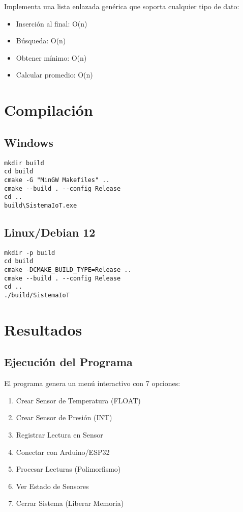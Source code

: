 \documentclass[12pt, spanish]{article}
\begin{document}
Implementa una lista enlazada genérica que soporta cualquier tipo de dato:
\begin{itemize}
    \item Inserción al final: O(n)
    \item Búsqueda: O(n)
    \item Obtener mínimo: O(n)
    \item Calcular promedio: O(n)
\end{itemize}

\section{Compilación}

\subsection{Windows}

\begin{verbatim}
mkdir build
cd build
cmake -G "MinGW Makefiles" ..
cmake --build . --config Release
cd ..
build\SistemaIoT.exe
\end{verbatim}

\subsection{Linux/Debian 12}

\begin{verbatim}
mkdir -p build
cd build
cmake -DCMAKE_BUILD_TYPE=Release ..
cmake --build . --config Release
cd ..
./build/SistemaIoT
\end{verbatim}

\section{Resultados}

\subsection{Ejecución del Programa}

El programa genera un menú interactivo con 7 opciones:

\begin{enumerate}
    \item Crear Sensor de Temperatura (FLOAT)
    \item Crear Sensor de Presión (INT)
    \item Registrar Lectura en Sensor
    \item Conectar con Arduino/ESP32
    \item Procesar Lecturas (Polimorfismo)
    \item Ver Estado de Sensores
    \item Cerrar Sistema (Liberar Memoria)
\end{enumerate}
\end{document}
